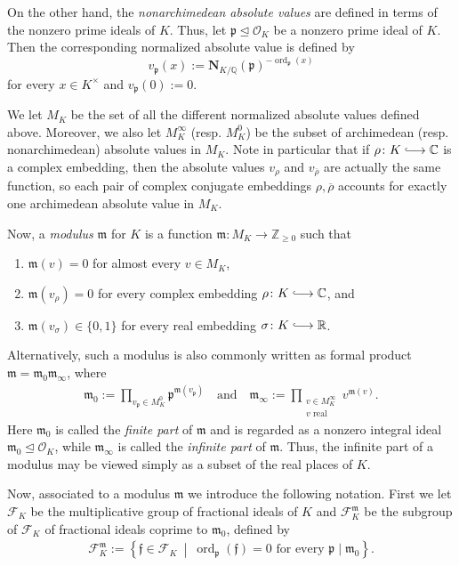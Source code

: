\documentclass[11pt, reqno]{amsart}
\numberwithin{equation}{section}
\newcommand{\hooklongrightarrow}{\lhook\joinrel\longrightarrow}
\newcommand{\Z}{\mathbb{Z}}
\newcommand{\C}{\mathbb{C}}
\newcommand{\Q}{\mathbb{Q}}
\newcommand{\R}{\mathbb{R}}
\theoremstyle{definition}
\begin{document}
On the other hand, the \textit{nonarchimedean absolute values} are defined in terms of the nonzero prime ideals of $K$. Thus, let $\mathfrak{p} \trianglelefteq \mathcal{O}_K$ be a nonzero prime ideal of $K$. Then the corresponding normalized absolute value is defined by 
$$
v_{\mathfrak{p}}(x) := \mathbf{N}_{K/\Q}(\mathfrak{p})^{-\operatorname{ord}_{\mathfrak{p}}(x)}
$$
for every $x \in K^{\times}$ and $v_{\mathfrak{p}}(0) := 0$. 

We let $M_K$ be the set of all the different normalized absolute values defined above. Moreover, we also let $M_K^{\infty}$ (resp. $M_K^0$) be the subset of archimedean (resp. nonarchimedean) absolute values in $M_K$. Note in particular that if $\rho \colon K \hooklongrightarrow \C$ is a complex embedding, then the absolute values $v_{\rho}$ and $v_{\overline{\rho}}$ are actually the same function, so each pair of complex conjugate embeddings $\rho, \overline{\rho}$ accounts for exactly one archimedean absolute value in $M_K$.


Now, a \textit{modulus} $\mathfrak{m}$ for $K$ is a function $\mathfrak{m} \colon M_K \longrightarrow \Z_{\geq 0}$ such that
\begin{enumerate}
    \item $\mathfrak{m}(v) = 0$ for almost every $v \in M_K$,
    \item $\mathfrak{m}(v_{\rho}) = 0$ for every complex embedding $\rho \colon K \hooklongrightarrow \C$, and
    \item $\mathfrak{m}(v_{\sigma}) \in \{ 0, 1 \}$ for every real embedding $\sigma \colon K \hooklongrightarrow \R$.
\end{enumerate}
Alternatively, such a modulus is also commonly written as formal product $\mathfrak{m} = \mathfrak{m}_0 \mathfrak{m}_\infty$, where
\begin{align*}
\mathfrak{m}_0:=\prod_{v_{\mathfrak{p}} \in M_K^{0}} \mathfrak{p}^{\mathfrak{m}(v_{\mathfrak{p}})}
\quad \text{and} \quad
\mathfrak{m}_{\infty}:=\prod_{\substack{v \in M_K^{\infty}\\\text{$v$ real}}} v^{\mathfrak{m}(v)}
.
\end{align*}
Here $\mathfrak{m}_0$ is called the \textit{finite part} of $\mathfrak{m}$ and is regarded as a nonzero integral ideal $\mathfrak{m}_0 \trianglelefteq \mathcal{O}_K$, while $\mathfrak{m}_{\infty}$ is called the \textit{infinite part} of $\mathfrak{m}$. Thus, the infinite part of a modulus may be viewed
simply as a subset of the real places of $K$.

Now, associated to a modulus $\mathfrak{m}$ we introduce the following notation. First we let $\mathcal{F}_K$ be the multiplicative group of fractional ideals of $K$ and $\mathcal{F}_K^{\mathfrak{m}}$ be the subgroup of $\mathcal{F}_K$ of fractional ideals coprime to $\mathfrak{m}_0$, defined by
\begin{align*}
\mathcal{F}_K^{\mathfrak{m}} := \left\{
\mathfrak{f}\in \mathcal{F}_K
\ \middle|\
\operatorname{ord}_{\mathfrak{p}}(\mathfrak{f})=0
\text{ for every } \mathfrak{p}\mid \mathfrak{m}_0
\right\}.
\end{align*}
\end{document}
